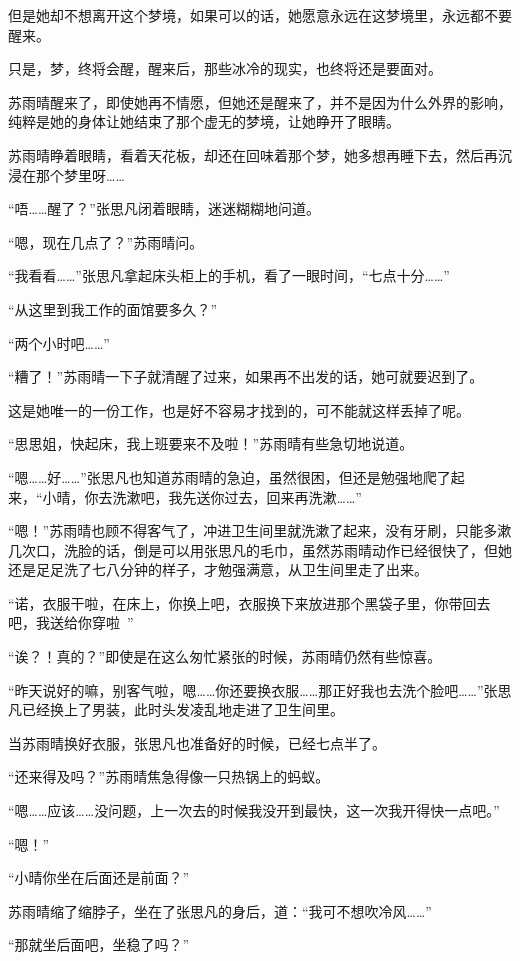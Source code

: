 但是她却不想离开这个梦境，如果可以的话，她愿意永远在这梦境里，永远都不要醒来。

只是，梦，终将会醒，醒来后，那些冰冷的现实，也终将还是要面对。

苏雨晴醒来了，即使她再不情愿，但她还是醒来了，并不是因为什么外界的影响，纯粹是她的身体让她结束了那个虚无的梦境，让她睁开了眼睛。

苏雨晴睁着眼睛，看着天花板，却还在回味着那个梦，她多想再睡下去，然后再沉浸在那个梦里呀……

“唔……醒了？”张思凡闭着眼睛，迷迷糊糊地问道。

“嗯，现在几点了？”苏雨晴问。

“我看看……”张思凡拿起床头柜上的手机，看了一眼时间，“七点十分……”

“从这里到我工作的面馆要多久？”

“两个小时吧……”

“糟了！”苏雨晴一下子就清醒了过来，如果再不出发的话，她可就要迟到了。

这是她唯一的一份工作，也是好不容易才找到的，可不能就这样丢掉了呢。

“思思姐，快起床，我上班要来不及啦！”苏雨晴有些急切地说道。

“嗯……好……”张思凡也知道苏雨晴的急迫，虽然很困，但还是勉强地爬了起来，“小晴，你去洗漱吧，我先送你过去，回来再洗漱……”

“嗯！”苏雨晴也顾不得客气了，冲进卫生间里就洗漱了起来，没有牙刷，只能多漱几次口，洗脸的话，倒是可以用张思凡的毛巾，虽然苏雨晴动作已经很快了，但她还是足足洗了七八分钟的样子，才勉强满意，从卫生间里走了出来。

“诺，衣服干啦，在床上，你换上吧，衣服换下来放进那个黑袋子里，你带回去吧，我送给你穿啦~”

“诶？！真的？”即使是在这么匆忙紧张的时候，苏雨晴仍然有些惊喜。

“昨天说好的嘛，别客气啦，嗯……你还要换衣服……那正好我也去洗个脸吧……”张思凡已经换上了男装，此时头发凌乱地走进了卫生间里。

当苏雨晴换好衣服，张思凡也准备好的时候，已经七点半了。

“还来得及吗？”苏雨晴焦急得像一只热锅上的蚂蚁。

“嗯……应该……没问题，上一次去的时候我没开到最快，这一次我开得快一点吧。”

“嗯！”

“小晴你坐在后面还是前面？”

苏雨晴缩了缩脖子，坐在了张思凡的身后，道：“我可不想吹冷风……”

“那就坐后面吧，坐稳了吗？”

